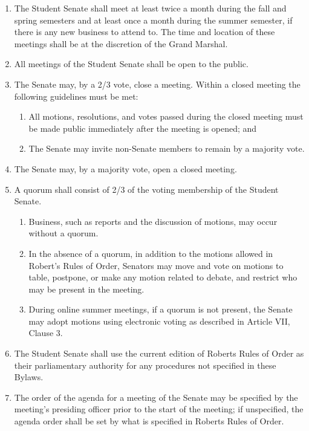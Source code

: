 \documentclass{uniondoc}
\begin{document}

\begin{enumerate}
	\item The Student Senate shall meet at least twice a month during the fall and spring semesters and at least once a month during the summer semester, if there is any new business to attend to.
	      The time and location of these meetings shall be at the discretion of the Grand Marshal.
	\item All meetings of the Student Senate shall be open to the public.
	\item The Senate may, by a 2/3 vote, close a meeting.
	      Within a closed meeting the following guidelines must be met:
	      \begin{enumerate}
		      \item All motions, resolutions, and votes passed during the closed meeting must be made public immediately after the meeting is opened; and
		      \item The Senate may invite non-Senate members to remain by a majority vote.
	      \end{enumerate}
	\item The Senate may, by a majority vote, open a closed meeting.
	\item A quorum shall consist of 2/3 of the voting membership of the Student Senate.
	      \begin{enumerate}
		      \item Business, such as reports and the discussion of motions, may occur without a quorum.
		      \item In the absence of a quorum, in addition to the motions allowed in Robert’s Rules of Order, Senators may move and vote on motions to table, postpone, or make any motion related to debate, and restrict who may be present in the meeting.
		      \item During online summer meetings, if a quorum is not present, the Senate may adopt motions using electronic voting as described in Article VII, Clause 3.
	      \end{enumerate}
	\item The Student Senate shall use the current edition of Roberts Rules of Order as their parliamentary authority for any procedures not specified in these Bylaws.
	\item The order of the agenda for a meeting of the Senate may be specified by the meeting’s presiding officer prior to the start of the meeting;
	      if unspecified, the agenda order shall be set by what is specified in Roberts Rules of Order.

\end{enumerate}
\end{document}

